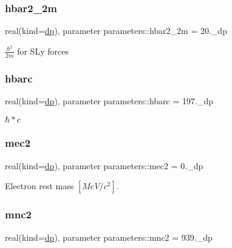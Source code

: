 \subsubsection{\texorpdfstring{hbar2\+\_\+2m}{hbar2\_2m}}
{\footnotesize\ttfamily real(kind=\mbox{\hyperlink{namespaceparameters_a52f8c6351fd79345d8811e065bcbbb37}{dp}}), parameter parameters\+::hbar2\+\_\+2m = 20.\+\_\+dp}



$\frac{\hbar^2}{2m}$ for S\+Ly forces 

\mbox{\label{group__CONSTANTS_gafb47622609b676d956b2c58f4b909064}} 
\subsubsection{\texorpdfstring{hbarc}{hbarc}}
{\footnotesize\ttfamily real(kind=\mbox{\hyperlink{namespaceparameters_a52f8c6351fd79345d8811e065bcbbb37}{dp}}), parameter parameters\+::hbarc = 197.\+\_\+dp}



$\hbar*c$ 

\mbox{\label{group__CONSTANTS_ga8b91e60e1e7c4b066cc282415c740bc9}} 
\subsubsection{\texorpdfstring{mec2}{mec2}}
{\footnotesize\ttfamily real(kind=\mbox{\hyperlink{namespaceparameters_a52f8c6351fd79345d8811e065bcbbb37}{dp}}), parameter parameters\+::mec2 = 0.\+\_\+dp}



Electron rest mass $[MeV/c^2]$. 

\mbox{\label{group__CONSTANTS_ga3cd51d33e13930045ff98294b5044e2c}} 
\subsubsection{\texorpdfstring{mnc2}{mnc2}}
{\footnotesize\ttfamily real(kind=\mbox{\hyperlink{namespaceparameters_a52f8c6351fd79345d8811e065bcbbb37}{dp}}), parameter parameters\+::mnc2 = 939.\+\_\+dp}

